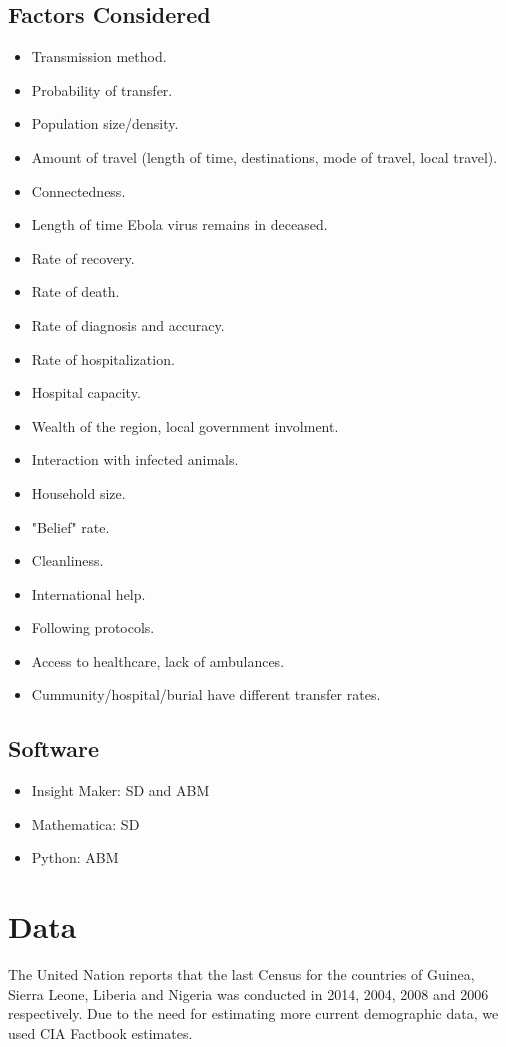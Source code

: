 \documentclass[10pt]{article}
\begin{document}
\subsection{Factors Considered}
\begin{itemize}
\item Transmission method.
\item Probability of transfer.
\item Population size/density.
\item Amount of travel (length of time, destinations, mode of travel, local travel).
\item Connectedness.
\item Length of time Ebola virus remains in deceased.
\item Rate of recovery.
\item Rate of death.
\item Rate of diagnosis and accuracy.
\item Rate of hospitalization.
\item Hospital capacity.
\item Wealth of the region, local government involment.
\item Interaction with infected animals.
\item Household size.
\item "Belief" rate.
\item Cleanliness.
\item International help.
\item Following protocols.
\item Access to healthcare, lack of ambulances.
\item Cummunity/hospital/burial have different transfer rates.
\end{itemize}

\subsection{Software}
\begin{itemize}
\item Insight Maker: SD and ABM
\item Mathematica: SD
\item Python: ABM

\end{itemize}
\section{Data}
The United Nation reports that the last Census for the countries of Guinea, Sierra Leone, Liberia and Nigeria  was conducted in 2014, 2004, 2008 and 2006 respectively. Due to the need for estimating more current demographic data, we used CIA Factbook estimates. 
\end{document}
